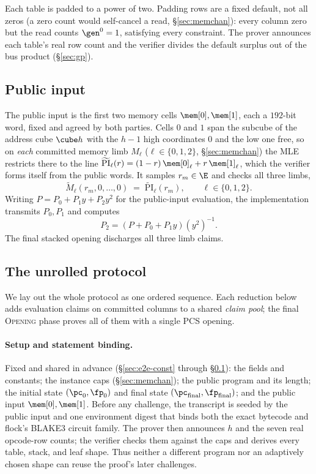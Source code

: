 Each table is padded to a power of two. Padding rows are a fixed default, not all zeros (a zero count would self-cancel a read, \S\ref{sec:memchan}): every column zero but the read counts $\gen^{0}=1$, satisfying every constraint. The prover announces each table's real row count and the verifier divides the default surplus out of the bus product (\S\ref{sec:gp}).

\subsection{Public input}\label{sec:e2e-pi}

The public input is the first two memory cells $\mem[0],\mem[1]$, each a $192$-bit word, fixed and agreed by both parties. Cells $0$ and $1$ span the subcube of the address cube $\cube h$ with the $h-1$ high coordinates $0$ and the low one free, so on \emph{each} committed memory limb $M_\ell$ ($\ell\in\{0,1,2\}$, \S\ref{sec:memchan}) the MLE restricts there to the line $\widetilde{\mathrm{PI}}_\ell(r)=(1-r)\,\mem[0]_\ell+r\,\mem[1]_\ell$, which the verifier forms itself from the public words. It samples $r_m\in\E$ and checks all three limbs,
\[
  \widetilde M_\ell(r_m,0,\dots,0)\;=\;\widetilde{\mathrm{PI}}_\ell(r_m),\qquad \ell\in\{0,1,2\}.
\]
Writing $P=P_0+P_1y+P_2y^2$ for the public-input evaluation, the implementation transmits $P_0,P_1$ and computes
\[
P_2=(P+P_0+P_1y)(y^2)^{-1}.
\]
The final stacked opening discharges all three limb claims.

\subsection{The unrolled protocol}\label{sec:e2e-unrolled}

We lay out the whole protocol as one ordered sequence. Each reduction below adds evaluation claims on committed columns to a shared \emph{claim pool}; the final \textsc{Opening} phase proves all of them with a single PCS opening.

\paragraph{Setup and statement binding.} Fixed and shared in advance (\S\ref{sec:e2e-const} through \S\ref{sec:e2e-pi}): the fields and constants; the instance caps (\S\ref{sec:memchan}); the public program and its length; the initial state $(\pc_0,\fp_0)$ and final state $(\pc_{\mathrm{final}},\fp_{\mathrm{final}})$; and the public input $\mem[0],\mem[1]$. Before any challenge, the transcript is seeded by the public input and one environment digest that binds both the exact bytecode and flock's BLAKE3 circuit family. The prover then announces $h$ and the seven real opcode-row counts; the verifier checks them against the caps and derives every table, stack, and leaf shape. Thus neither a different program nor an adaptively chosen shape can reuse the proof's later challenges.

